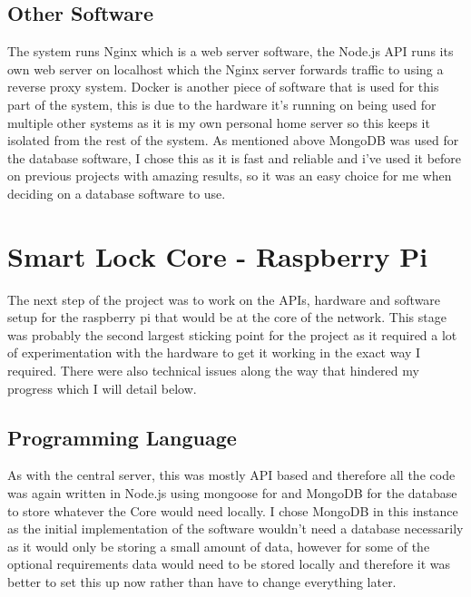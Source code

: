 \subsection{Other Software}
The system runs Nginx which is a web server software, the Node.js API runs its own web server on localhost which the Nginx server forwards traffic to using a reverse proxy system. Docker is another piece of software that is used for this part of the system, this is due to the hardware it's running on being used for multiple other systems as it is my own personal home server so this keeps it isolated from the rest of the system. As mentioned above MongoDB was used for the database software, I chose this as it is fast and reliable and i've used it before on previous projects with amazing results, so it was an easy choice for me when deciding on a database software to use.

\section{Smart Lock Core - Raspberry Pi}
The next step of the project was to work on the APIs, hardware and software setup for the raspberry pi that would be at the core of the network. This stage was probably the second largest sticking point for the project as it required a lot of experimentation with the hardware to get it working in the exact way I required. There were also technical issues along the way that hindered my progress which I will detail below.

\subsection{Programming Language}
As with the central server, this was mostly API based and therefore all the code was again written in Node.js using mongoose for and MongoDB for the database to store whatever the Core would need locally. I chose MongoDB in this instance as the initial implementation of the software wouldn't need a database necessarily as it would only be storing a small amount of data, however for some of the optional requirements data would need to be stored locally and therefore it was better to set this up now rather than have to change everything later.

